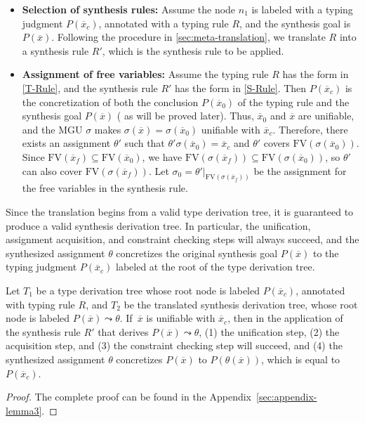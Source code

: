 \documentclass[manuscript,screen]{acmart}
\newcommand{\mvhzc}{\text{FV}}
\begin{document}
\begin{itemize}
  \item \textbf{Selection of synthesis rules:}  
  Assume the node $n_1$ is labeled with a typing judgment $P(\overline{x}_c)$, annotated with a typing rule $R$, and the synthesis goal is $P(\overline{x})$. Following the procedure in \autoref{sec:meta-translation}, we translate $R$ into a synthesis rule $R'$, which is the synthesis rule to be applied.

  \item \textbf{Assignment of free variables:}  
    Assume the typing rule $R$ has the form in \autoref{T-Rule}, and the synthesis rule $R'$ has the form in \autoref{S-Rule}. 
    Then $P(\overline{x}_c)$ is the concretization of both the conclusion $P(\overline{x}_0)$ of the typing rule and the synthesis goal $P(\overline{x})$ (   {\color{revblue}as will } be proved later). 
    Thus, $\overline{x}_0$ and $\overline{x}$ are unifiable, and the MGU $\sigma$ makes $\sigma(\overline{x}) = \sigma(\overline{x}_0)$ unifiable with $\overline{x}_c$. Therefore, there exists an assignment $\theta'$ such that $\theta'\sigma(\overline{x}_0) = \overline{x}_c$ and $\theta'$ covers $\mvhzc(\sigma(\overline{x}_0))$. Since $\mvhzc(\overline{x}_f) \subseteq \mvhzc(\overline{x}_0)$, we have $\mvhzc(\sigma(\overline{x}_f)) \subseteq \mvhzc(\sigma(\overline{x}_0))$, so $\theta'$ can also cover $\mvhzc(\sigma(\overline{x}_f))$. Let $\sigma_0 = \theta'|_{\mvhzc(\sigma(\overline{x}_f))}$ be the assignment for the free variables in the synthesis rule.
\end{itemize}

Since the translation begins from a valid type derivation tree, it is guaranteed to produce a valid synthesis derivation tree. In particular, the unification, assignment acquisition, and constraint checking steps will always succeed, and the synthesized assignment $\theta$ concretizes the original synthesis goal $P(\overline{x})$ to the typing judgment $P(\overline{x}_c)$ labeled at the root of the type derivation tree.

\begin{lemma}
\label{lemma:translation}
Let $T_1$ be a type derivation tree whose root node is labeled $P(\overline{x}_c)$, annotated with typing rule $R$, and $T_2$ be the translated synthesis derivation tree, whose root node is labeled $P(\overline{x}) \leadsto \theta$.
If $\,\overline{x}$ is unifiable with $\overline{x}_c$, then in the application of the synthesis rule $R'$ that derives $P(\overline{x}) \leadsto \theta$, (1) the unification step, (2) the acquisition step, and (3) the constraint checking step will succeed, and (4) the synthesized assignment $\theta$ concretizes $P(\overline{x})$ to $P(\theta(\overline{x}))$, which is equal to $P(\overline{x}_c)$.
\end{lemma}
\begin{proof}
  The complete proof can be found in the Appendix~\ref{sec:appendix-lemma3}.
\end{proof}
\end{document}
